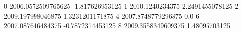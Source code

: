 0 2006.0572509765625 -1.817626953125
1 2010.1240234375 2.2491455078125
2 2009.197998046875 1.3231201171875
4 2007.8748779296875 0.0
6 2007.087646484375 -0.7872314453125
8 2009.3558349609375 1.48095703125
